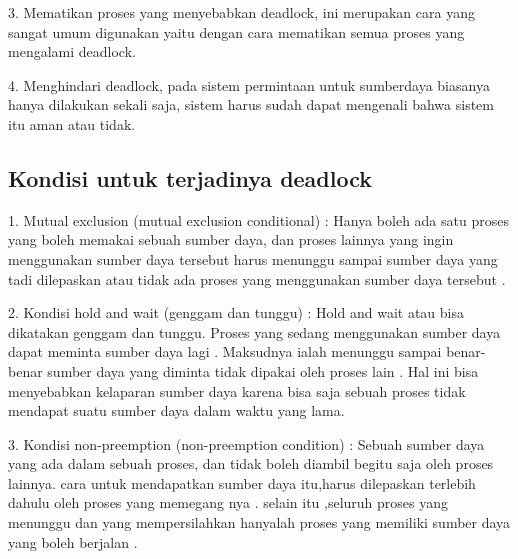 	3. Mematikan proses yang menyebabkan deadlock, ini merupakan cara yang sangat umum digunakan yaitu dengan cara mematikan semua proses yang mengalami deadlock.
	
	4. Menghindari deadlock, pada sistem permintaan untuk sumberdaya biasanya hanya dilakukan sekali saja, sistem harus sudah dapat mengenali bahwa sistem itu aman atau tidak.
	
\subsection {Kondisi untuk terjadinya deadlock}
	1. Mutual exclusion (mutual exclusion conditional) : Hanya boleh ada satu proses yang boleh memakai sebuah sumber daya, dan proses lainnya yang ingin menggunakan sumber daya tersebut harus menunggu sampai sumber daya yang tadi dilepaskan atau tidak ada proses yang menggunakan sumber daya tersebut .
	
	2. Kondisi hold and wait (genggam dan tunggu) : Hold and wait atau bisa dikatakan genggam dan tunggu. Proses yang sedang menggunakan sumber daya dapat meminta sumber daya lagi . Maksudnya ialah menunggu sampai benar-benar sumber daya yang diminta tidak dipakai oleh proses lain . Hal ini bisa menyebabkan kelaparan sumber daya karena bisa saja sebuah proses tidak mendapat suatu sumber daya dalam waktu yang lama.
	
	3. Kondisi non-preemption (non-preemption condition) : Sebuah sumber daya yang ada dalam sebuah proses, dan tidak boleh diambil begitu saja oleh proses lainnya. cara untuk mendapatkan sumber daya itu,harus dilepaskan terlebih dahulu oleh proses yang memegang nya . selain itu ,seluruh proses yang menunggu dan yang mempersilahkan hanyalah proses yang memiliki sumber daya yang boleh berjalan .